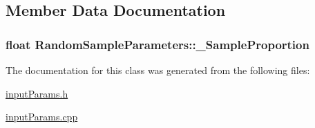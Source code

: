 \subsection{Member Data Documentation}
\hypertarget{classRandomSampleParameters_acae54fe4b8743efb653cb341307a3c4c}{
\subsubsection[{\-\_\-\-Sample\-Proportion}]{\setlength{\rightskip}{0pt plus 5cm}float Random\-Sample\-Parameters\-::\-\_\-\-Sample\-Proportion\hspace{0.3cm}{\ttfamily [private]}}}\label{classRandomSampleParameters_acae54fe4b8743efb653cb341307a3c4c}


The documentation for this class was generated from the following files\-:\begin{DoxyCompactItemize}
\item 
\hyperlink{inputParams_8h}{input\-Params.\-h}\item 
\hyperlink{inputParams_8cpp}{input\-Params.\-cpp}\end{DoxyCompactItemize}
